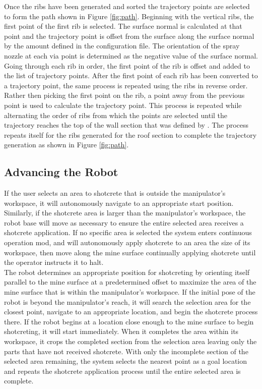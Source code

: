 Once the ribs have been generated and sorted the trajectory points are selected to form the path shown in Figure \ref{fig:path}. Beginning with the vertical ribs, the first point of the first rib is selected. The surface normal is calculated at that point and the trajectory point is offset from the surface along the surface normal by the amount defined in the configuration file. The orientation of the spray nozzle at each via point is determined as the negative value of the surface normal. Going through each rib in order, the first point of the rib is offset and added to the list of trajectory points. After the first point of each rib has been converted to a trajectory point, the same process is repeated using the ribs in reverse order. Rather then picking the first point on the rib, a point  away from the previous point is used to calculate the trajectory point. This process is repeated while alternating the order of ribs from which the points are selected until the trajectory reaches the top of the wall section that was defined by . The process repeats itself for the ribs generated for the roof section to complete the trajectory generation as shown in Figure \ref{fig:path}.\\

\subsection{Advancing the Robot}

If the user selects an area to shotcrete that is outside the manipulator's workspace, it will autonomously navigate to an appropriate start position. Similarly, if the shotcrete area is larger than the manipulator's workspace, the robot base will move as necessary to ensure the entire selected area receives a shotcrete application. If no specific area is selected the system enters continuous operation mod, and will autonomously apply shotcrete to an area the size of its workspace, then move along the mine surface continually applying shotcrete until the operator instructs it to halt.\\

The robot determines an appropriate position for shotcreting by orienting itself parallel to the mine surface at a predetermined offset to maximize the area of the mine surface that is within the manipulator's workspace. If the initial pose of the robot is beyond the manipulator's reach, it will search the selection area for the closest point, navigate to an appropriate location, and begin the shotcrete process there. If the robot begins at a location close enough to the mine surface to begin shotcreting, it will start immediately. When it completes the area within its workspace, it crops the completed section from the selection area leaving only the parts that have not received shotcrete. With only the incomplete section of the selected area remaining, the system selects the nearest point as a goal location and repeats the shotcrete application process until the entire selected area is complete.\\

